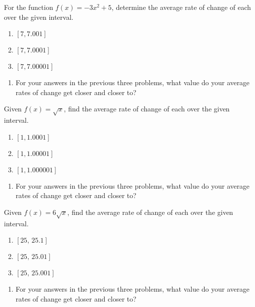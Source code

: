 For the function $f(x) = -3x^2 + 5$, determine the average rate of change of each over the given interval.
\begin{enumerate}
\setcounter{enumi}{\value{Review}}
    \item $[7, 7.001]$
    \item $[7, 7.0001]$
    \item $[7, 7.00001]$
\setcounter{Review}{\value{enumi}}
\end{enumerate}

\begin{enumerate}
\setcounter{enumi}{\value{Review}}
\item For your answers in the previous three problems, what value do your average rates of change get closer and closer to?
\setcounter{Review}{\value{enumi}}
\end{enumerate}

\newpage

Given $f(x) = \sqrt{x}$, find the average rate of change of each over the given interval.
\begin{enumerate}
\setcounter{enumi}{\value{Review}}
	\item $[1, 1.0001]$
	\item $[1, 1.00001]$
	\item $[1, 1.000001]$
\setcounter{Review}{\value{enumi}}
\end{enumerate}

\begin{enumerate}
\setcounter{enumi}{\value{Review}}
\item For your answers in the previous three problems, what value do your average rates of change get closer and closer to?
\setcounter{Review}{\value{enumi}}
\end{enumerate}


Given $f(x) = 6\sqrt{x}$, find the average rate of change of each over the given interval.
\begin{enumerate}
\setcounter{enumi}{\value{Review}}
	\item $[25,\, 25.1]$
	\item $[25, \, 25.01]$
	\item $[25, \, 25.001]$
\setcounter{Review}{\value{enumi}}
\end{enumerate}

\begin{enumerate}
\setcounter{enumi}{\value{Review}}
\item For your answers in the previous three problems, what value do your average rates of change get closer and closer to?
\setcounter{Review}{\value{enumi}}
\end{enumerate}

